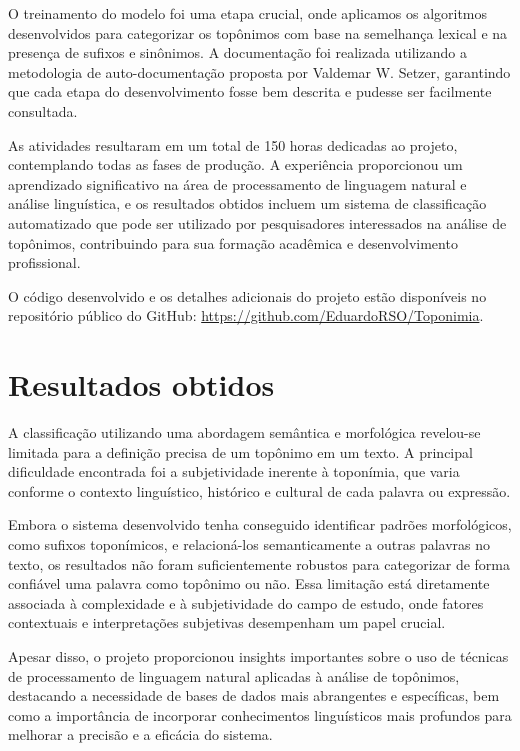 \documentclass{article}
\begin{document}
O treinamento do modelo foi uma etapa crucial, onde aplicamos os algoritmos desenvolvidos para categorizar os topônimos com base na semelhança lexical e na presença de sufixos e sinônimos. A documentação foi realizada utilizando a metodologia de auto-documentação proposta por Valdemar W. Setzer, garantindo que cada etapa do desenvolvimento fosse bem descrita e pudesse ser facilmente consultada.

As atividades resultaram em um total de 150 horas dedicadas ao projeto, contemplando todas as fases de produção. A experiência proporcionou um aprendizado significativo na área de processamento de linguagem natural e análise linguística, e os resultados obtidos incluem um sistema de classificação automatizado que pode ser utilizado por pesquisadores interessados na análise de topônimos, contribuindo para sua formação acadêmica e desenvolvimento profissional.

O código desenvolvido e os detalhes adicionais do projeto estão disponíveis no repositório público do GitHub: \url{https://github.com/EduardoRSO/Toponimia}.

\section*{Resultados obtidos}
A classificação utilizando uma abordagem semântica e morfológica revelou-se limitada para a definição precisa de um topônimo em um texto. A principal dificuldade encontrada foi a subjetividade inerente à toponímia, que varia conforme o contexto linguístico, histórico e cultural de cada palavra ou expressão.

Embora o sistema desenvolvido tenha conseguido identificar padrões morfológicos, como sufixos toponímicos, e relacioná-los semanticamente a outras palavras no texto, os resultados não foram suficientemente robustos para categorizar de forma confiável uma palavra como topônimo ou não. Essa limitação está diretamente associada à complexidade e à subjetividade do campo de estudo, onde fatores contextuais e interpretações subjetivas desempenham um papel crucial.

Apesar disso, o projeto proporcionou insights importantes sobre o uso de técnicas de processamento de linguagem natural aplicadas à análise de topônimos, destacando a necessidade de bases de dados mais abrangentes e específicas, bem como a importância de incorporar conhecimentos linguísticos mais profundos para melhorar a precisão e a eficácia do sistema.
\end{document}
